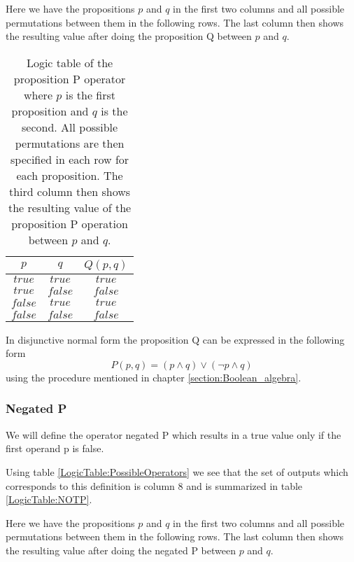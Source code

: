         Here we have the propositions $p$ and $q$ in the first two columns and all possible permutations between them in the following rows. The last column then shows the resulting value after doing the proposition Q between $p$ and $q$.
        
        \begin{table}[h!]
            \centering
            \begin{tabular}{|c|c|c|}
            	\hline
            	  $p$   &   $q$   & $Q(p, q)$ \\ \hline
            	$true$  & $true$  &  $true$   \\ \hline
            	$true$  & $false$ &  $false$  \\ \hline
            	$false$ & $true$  &  $true$   \\ \hline
            	$false$ & $false$ &  $false$  \\ \hline
            \end{tabular}
            \caption{Logic table of the proposition P operator where $p$ is the first proposition and $q$ is the second. All possible permutations are then specified in each row for each proposition. The third column then shows the resulting value of the proposition P operation between $p$ and $q$.}
            \label{LogicTable:Q}
        \end{table}
        
        In disjunctive normal form the proposition Q can be expressed in the following form
        \begin{equation}
            P(p, q) = (p \wedge q) \vee (\neg p \wedge  q)
        \end{equation}
        using the procedure mentioned in chapter \ref{section:Boolean_algebra}.
    
    \subsubsection{Negated P}
        We will define the operator negated P which results in a true value only if the first operand p is false.
        
        Using table \ref{LogicTable:PossibleOperators} we see that the set of outputs which corresponds to this definition is column 8 and is summarized in table \ref{LogicTable:NOTP}.
        
        Here we have the propositions $p$ and $q$ in the first two columns and all possible permutations between them in the following rows. The last column then shows the resulting value after doing the negated P between $p$ and $q$.
        

